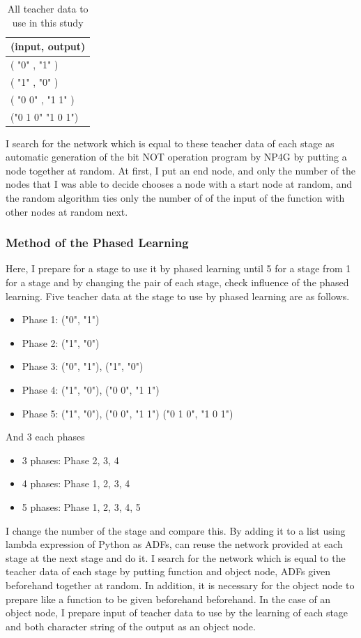 \documentclass{article}
\begin{document}
\begin{table}[htbp]
\centering
\caption {All teacher data to use in this study}
\label{tbl:TeacherData}
\begin{tabular}{l}
\hline
(input, output) \\
\hline \hline
( "0" , "1" ) \\
( "1" , "0" ) \\
( "0 0" , "1 1" ) \\
("0 1 0" "1 0 1") \\
\hline
\end{tabular}
\end{table}

I search for the network which is equal to these teacher data of each stage as automatic generation of the bit NOT operation program by NP4G by putting a node together at random.
At first, I put an end node, and only the number of the nodes that I was able to decide chooses a node with a start node at random, and the random algorithm ties only the number of of the input of the function with other nodes at random next.

\subsubsection {Method of the Phased Learning}
\label{sec:PLhow}
Here, I prepare for a stage to use it by phased learning until 5 for a stage from 1 for a stage and by changing the pair of each stage, check influence of the phased learning.
Five teacher data at the stage to use by phased learning are as follows.

\begin{itemize}
\item Phase 1: ("0", "1")
\item Phase 2: ("1", "0")
\item Phase 3: ("0", "1"), ("1", "0")
\item Phase 4: ("1", "0"), ("0 0", "1 1")
\item Phase 5: ("1", "0"), ("0 0", "1 1") ("0 1 0", "1 0 1")
\end{itemize}

And 3 each phases
\begin{itemize}
\item 3 phases:
Phase 2, 3, 4
\item 4 phases:
Phase 1, 2, 3, 4
\item 5 phases:
Phase 1, 2, 3, 4, 5
\end{itemize}
\noindent

I change the number of the stage and compare this.
By adding it to a list using lambda expression of Python as ADFs, can reuse the network provided at each stage at the next stage and do it.
I search for the network which is equal to the teacher data of each stage by putting function and object node, ADFs given beforehand together at random.
In addition, it is necessary for the object node to prepare like a function to be given beforehand beforehand.
In the case of an object node, I prepare input of teacher data to use by the learning of each stage and both character string of the output as an object node.
\end{document}
